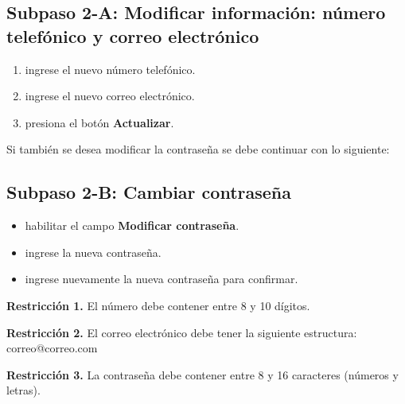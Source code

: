 \subsection{Subpaso 2-A: Modificar información: número telefónico y correo electrónico}
\begin{enumerate}
	\item ingrese el nuevo número telefónico.
	\item ingrese el nuevo correo electrónico.
	\item presiona el botón \textbf{Actualizar}. 
\end{enumerate}

	Si también se desea modificar la contraseña se debe continuar
con lo siguiente:

\subsection{Subpaso 2-B: Cambiar contraseña}
\begin{itemize}
	\item habilitar el campo \textbf{Modificar contraseña}.
	\item ingrese la nueva contraseña.
	\item ingrese nuevamente la nueva contraseña para confirmar.
\end{itemize}

\textbf{Restricción 1.} El número debe contener entre 8 y 10
	dígitos.

\textbf{Restricción 2.} El correo electrónico debe tener la 
	siguiente estructura: correo@correo.com

\textbf{Restricción 3.} La contraseña debe contener entre 8 y 16
	caracteres (números y letras).